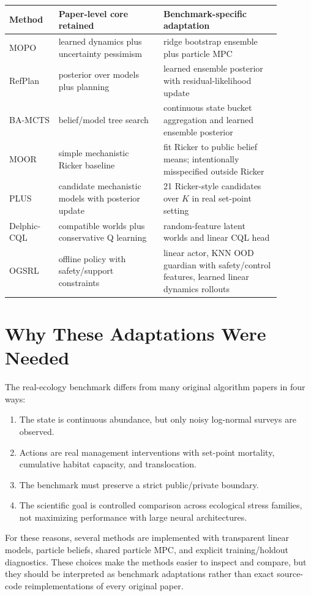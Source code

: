 \documentclass[11pt]{article}
\newcommand{\1}{\mathbf{1}}
\begin{document}
\begin{center}
\begin{longtable}{p{0.16\linewidth}p{0.34\linewidth}p{0.38\linewidth}}
\toprule
Method & Paper-level core retained & Benchmark-specific adaptation \\
\midrule
\endhead
MOPO & learned dynamics plus uncertainty pessimism & ridge bootstrap ensemble plus particle MPC \\
RefPlan & posterior over models plus planning & learned ensemble posterior with residual-likelihood update \\
BA-MCTS & belief/model tree search & continuous state bucket aggregation and learned ensemble posterior \\
MOOR & simple mechanistic Ricker baseline & fit Ricker to public belief means; intentionally misspecified outside Ricker \\
PLUS & candidate mechanistic models with posterior update & 21 Ricker-style candidates over $K$ in real set-point setting \\
Delphic-CQL & compatible worlds plus conservative Q learning & random-feature latent worlds and linear CQL head \\
OGSRL & offline policy with safety/support constraints & linear actor, KNN OOD guardian with safety/control features, learned linear dynamics rollouts \\
\bottomrule
\end{longtable}
\end{center}

\section{Why These Adaptations Were Needed}

The real-ecology benchmark differs from many original algorithm papers in four
ways:
\begin{enumerate}[leftmargin=*]
  \item The state is continuous abundance, but only noisy log-normal surveys are
  observed.
  \item Actions are real management interventions with set-point mortality,
  cumulative habitat capacity, and translocation.
  \item The benchmark must preserve a strict public/private boundary.
  \item The scientific goal is controlled comparison across ecological stress
  families, not maximizing performance with large neural architectures.
\end{enumerate}

For these reasons, several methods are implemented with transparent linear models,
particle beliefs, shared particle MPC, and explicit training/holdout diagnostics.
These choices make the methods easier to inspect and compare, but they should be
interpreted as benchmark adaptations rather than exact source-code
reimplementations of every original paper.
\end{document}
